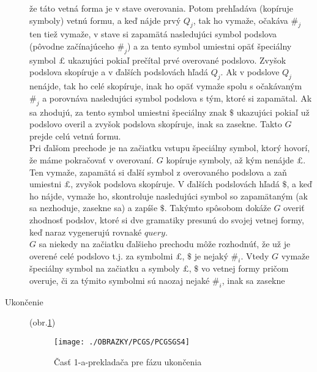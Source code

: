 \begin{dokaz}
\begin{description}
  že táto vetná forma je v stave overovania. Potom prehľadáva
  (kopíruje symboly) vetnú formu, a keď nájde prvý $Q_j$, tak ho
  vymaže, očakáva $\#_j$ ten tiež vymaže, v stave si zapamätá
  nasledujúci symbol podslova (pôvodne začínajúceho $\#_j$) a za
  tento symbol umiestni opäť špeciálny symbol $\pounds$ ukazujúci pokiaľ
  prečítal prvé overované podslovo. Zvyšok podslova skopíruje a v
  ďalších podslovách hľadá $Q_j$. Ak v podslove $Q_j$ nenájde, tak
  ho celé skopíruje, inak ho opäť vymaže spolu s očakávaným $\#_j$
  a porovnáva nasledujúci symbol podslova s tým, ktoré si
  zapamätal. Ak sa zhodujú, za tento symbol umiestni špeciálny
  znak $\$$ ukazujúci pokiaľ už podslovo overil a zvyšok podslova
  skopíruje, inak sa zasekne. Takto $G$ prejde celú vetnú formu.
  \\ Pri ďalšom prechode je na začiatku vstupu špeciálny symbol,
  ktorý hovorí, že máme pokračovať v overovaní. $G$ kopíruje
  symboly, až kým nenájde $\pounds$. Ten vymaže, zapamätá si ďalší
  symbol z overovaného podslova a zaň umiestni $\pounds$, zvyšok
  podslova skopíruje. V ďalších podslovách hľadá $\$$, a keď ho
  nájde, vymaže ho, skontroluje nasledujúci symbol so zapamätaným
  (ak sa nezhoduje, zasekne sa) a zapíše $\$$. Takýmto spôsobom
  dokáže $G$ overiť zhodnosť podslov, ktoré si dve gramatiky
  presunú do svojej vetnej formy, keď naraz vygenerujú rovnaké
  $query$.
  \\ $G$ sa niekedy na začiatku ďalšieho prechodu môže rozhodnúť,
  že už je overené celé podslovo t.j. za symbolmi $\pounds$, $\$$
  je nejaký $\#_i$. Vtedy $G$ vymaže špeciálny symbol na začiatku
  a symboly $\pounds$, $\$$ vo vetnej formy pričom overuje, či za
  týmito symbolmi sú naozaj nejaké $\#_i$, inak sa zasekne

  \item[Ukončenie] (obr.\ref{pcgsgs4})

\begin{figure}[ht]
  \centering
  \texttt{[image: ./OBRAZKY/PCGS/PCGSGS4]}
  \caption{Časť 1-a-prekladača pre fázu ukončenia}\label{pcgsgs4}
\end{figure}


\end{description}
\end{dokaz}
